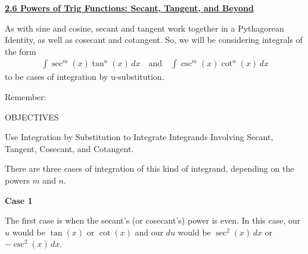 \textbf{\underline{\large{2.6 Powers of Trig Functions: Secant, Tangent, and Beyond}}} \par

As with sine and cosine, secant and tangent work together in a Pythagorean Identity, as well as cosecant and cotangent. So, we will be considering integrals of the form \begin{align*}
    \int \sec^m (x)\tan^n (x) \, dx \quad \text{and} \quad \int \csc^m (x)\cot^n (x) \, dx
\end{align*}
to be cases of integration by u-substitution. \par

Remember: \par


\begin{tcolorbox}[objective]
    \begin{center}
        OBJECTIVES \\[11pt]
    \end{center}
    Use Integration by Substitution to Integrate Integrands Involving Secant, Tangent, Cosecant, and Cotangent.
\end{tcolorbox}

There are three cases of integration of this kind of integrand, depending on the powers $m$ and $n$. \par

\textbf{Case 1} \par

The first case is when the secant's (or cosecant's) power is even. In this case, our $u$ would be $\tan (x)$ or $\cot (x)$ and our $du$ would be $\sec^2 (x) \, dx$ or $-\csc^2 (x) \, dx$. \par

